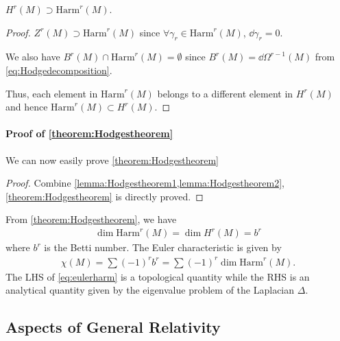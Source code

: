 \documentclass[10pt]{article}
\begin{document}
\begin{lemma}\label{lemma:Hodgestheorem2}
    $H^r(M)\supset\mathrm{Harm}^r(M)$.
\end{lemma}
\begin{proof}
    $Z^r(M)\supset\mathrm{Harm}^r(M)$ since $\forall\gamma_r\in\mathrm{Harm}^r(M)$, $\dd{\gamma_r}=0$.
    
    We also have $B^r(M)\cap\mathrm{Harm}^r(M)=\emptyset$ since $B^r(M)=\dd{\Omega^{r-1}(M)}$ from \eqref{eq:Hodgedecomposition}.
    
    Thus, each element in $\mathrm{Harm}^r(M)$ belongs to a different element in $H^r(M)$ and hence $\mathrm{Harm}^r(M)\subset H^r(M)$.
\end{proof}
\paragraph{Proof of \cref{theorem:Hodgestheorem}} We can now easily prove \cref{theorem:Hodgestheorem}
\begin{proof}
    Combine \cref{lemma:Hodgestheorem1,lemma:Hodgestheorem2}, \cref{theorem:Hodgestheorem} is directly proved.
\end{proof}
\begin{property}
    From \cref{theorem:Hodgestheorem}, we have 
    \begin{align}
        \dim\mathrm{Harm}^r(M)=\dim H^r(M)=b^r
    \end{align}
    where $b^r$ is the Betti number.
    The Euler characteristic is given by 
    \begin{align}
        \chi(M)=\sum(-1)^r b^r=\sum(-1)^r\dim\mathrm{Harm}^r(M).\label{eq:eulerharm}
    \end{align}
    The LHS of \eqref{eq:eulerharm} is a topological quantity while the RHS is an analytical quantity given by the eigenvalue problem of the Laplacian $\Delta$. 
\end{property}

\subsection{Aspects of General Relativity}
\end{document}
